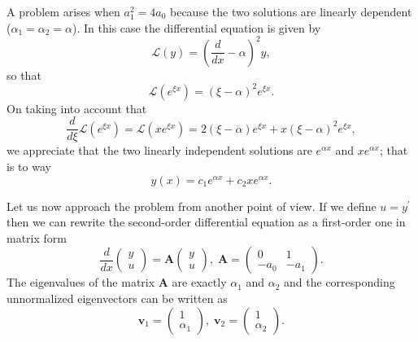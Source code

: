 \documentclass{article}
\begin{document}
A problem arises when $a_{1}^{2}=4a_{0}$ because the two solutions are
linearly dependent ($\alpha _{1}=\alpha _{2}=\alpha $). In this case the
differential equation is given by
\begin{equation}
\mathcal{L}(y)=\left( \frac{d}{dx}-\alpha \right) ^{2}y,  \label{eq:ode_ep}
\end{equation}
so that
\begin{equation}
\mathcal{L}\left( e^{\xi x}\right) =(\xi -\alpha )^{2}e^{\xi x}.
\end{equation}
On taking into account that
\begin{equation}
\frac{d}{d\xi }\mathcal{L}\left( e^{\xi x}\right) =\mathcal{L}\left( xe^{\xi
x}\right) =2(\xi -\alpha )e^{\xi x}+x(\xi -\alpha )^{2}e^{\xi x},
\end{equation}
we appreciate that the two linearly independent solutions are $e^{\alpha x}$
and $xe^{\alpha x}$; that is to way
\begin{equation}
y(x)=c_{1}e^{\alpha x}+c_{2}xe^{\alpha x}.  \label{eq:sol_ode_ep}
\end{equation}

Let us now approach the problem from another point of view. If we define $%
u=y^{\prime }$ then we can rewrite the second-order differential equation as
a first-order one in matrix form
\begin{equation}
\frac{d}{dx}\left(
\begin{array}{l}
y \\
u
\end{array}
\right) =\mathbf{A}\left(
\begin{array}{l}
y \\
u
\end{array}
\right) ,\;\mathbf{A}=\left(
\begin{array}{cc}
0 & 1 \\
-a_{0} & -a_{1}
\end{array}
\right) .  \label{eq:mat_dif_eq}
\end{equation}
The eigenvalues of the matrix $\mathbf{A}$ are exactly $\alpha _{1}$ and $%
\alpha _{2}$ and the corresponding unnormalized eigenvectors can be written
as
\begin{equation}
\mathbf{v}_{1}=\left(
\begin{array}{l}
1 \\
\alpha _{1}
\end{array}
\right) ,\;\mathbf{v}_{2}=\left(
\begin{array}{l}
1 \\
\alpha _{2}
\end{array}
\right) .  \label{eq:v1,v2_gen}
\end{equation}
\end{document}
